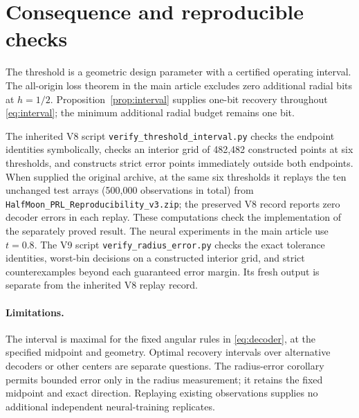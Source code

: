 \documentclass[11pt,a4paper]{article}
\numberwithin{equation}{section}
\begin{document}
\section{Consequence and reproducible checks}
The threshold is a geometric design parameter with a certified operating interval. The all-origin loss theorem in the main article excludes zero additional radial bits at $h=1/2$. Proposition~\ref{prop:interval} supplies one-bit recovery throughout \eqref{eq:interval}; the minimum additional radial budget remains one bit.

The inherited V8 script \texttt{verify\_threshold\_interval.py} checks the endpoint identities symbolically, checks an interior grid of 482,482 constructed points at six thresholds, and constructs strict error points immediately outside both endpoints. When supplied the original archive, at the same six thresholds it replays the ten unchanged test arrays (500,000 observations in total) from \texttt{HalfMoon\_PRL\_Reproducibility\_v3.zip}; the preserved V8 record reports zero decoder errors in each replay. These computations check the implementation of the separately proved result. The neural experiments in the main article use $t=0.8$. The V9 script \texttt{verify\_radius\_error.py} checks the exact tolerance identities, worst-bin decisions on a constructed interior grid, and strict counterexamples beyond each guaranteed error margin. Its fresh output is separate from the inherited V8 replay record.

\paragraph{Limitations.}
The interval is maximal for the fixed angular rules in \eqref{eq:decoder}, at the specified midpoint and geometry. Optimal recovery intervals over alternative decoders or other centers are separate questions. The radius-error corollary permits bounded error only in the radius measurement; it retains the fixed midpoint and exact direction. Replaying existing observations supplies no additional independent neural-training replicates.
\end{document}
